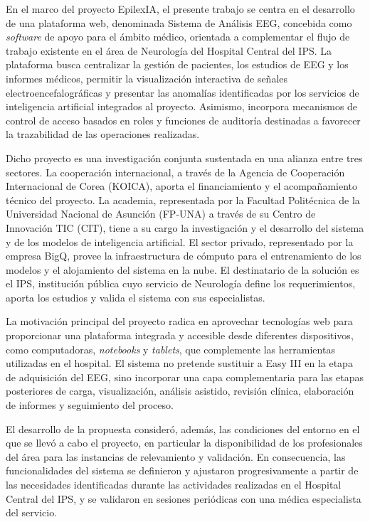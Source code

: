 
En el marco del proyecto EpilexIA, el presente trabajo se centra en el desarrollo de una plataforma web, denominada Sistema de Análisis EEG, concebida como \textit{software} de apoyo para el ámbito médico, orientada a complementar el flujo de trabajo existente en el área de Neurología del Hospital Central del IPS. La plataforma busca centralizar la gestión de pacientes, los estudios de EEG y los informes médicos, permitir la visualización interactiva de señales electroencefalográficas y presentar las anomalías identificadas por los servicios de inteligencia artificial integrados al proyecto. Asimismo, incorpora mecanismos de control de acceso basados en roles y funciones de auditoría destinadas a favorecer la trazabilidad de las operaciones realizadas.

Dicho proyecto es una investigación conjunta sustentada en una alianza entre tres sectores.
La cooperación internacional, a través de la Agencia de Cooperación Internacional de Corea (KOICA), aporta el financiamiento y el acompañamiento técnico del proyecto.
La academia, representada por la Facultad Politécnica de la Universidad Nacional de Asunción (FP-UNA) a través de su Centro de Innovación TIC (CIT), tiene a su cargo la investigación y el desarrollo del sistema y de los modelos de inteligencia artificial.
El sector privado, representado por la empresa BigQ, provee la infraestructura de cómputo para el entrenamiento de los modelos y el alojamiento del sistema en la nube.
El destinatario de la solución es el IPS, institución pública cuyo servicio de Neurología define los requerimientos, aporta los estudios y valida el sistema con sus especialistas.

La motivación principal del proyecto radica en aprovechar tecnologías web para proporcionar una plataforma integrada y accesible desde diferentes dispositivos, como computadoras, \textit{notebooks} y \textit{tablets}, que complemente
 las herramientas utilizadas en el hospital. El sistema no pretende sustituir a Easy III en la etapa de adquisición del EEG, sino incorporar una capa complementaria para las etapas posteriores de carga, visualización, análisis asistido, revisión clínica, elaboración de informes y seguimiento del proceso.

El desarrollo de la propuesta consideró, además, las condiciones del
entorno en el que se llevó a cabo el proyecto, en particular la
disponibilidad de los profesionales del área para las instancias de
relevamiento y validación. En consecuencia, las funcionalidades del sistema se definieron y ajustaron progresivamente a partir de las
necesidades identificadas durante las actividades realizadas en el
Hospital Central del IPS, y se validaron en sesiones periódicas con una
médica especialista del servicio.

